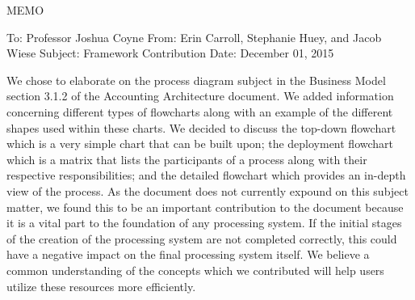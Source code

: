 MEMO

To:		Professor Joshua Coyne
From:		Erin Carroll, Stephanie Huey, and Jacob Wiese
Subject:	Framework Contribution
Date:		December 01, 2015

	We chose to elaborate on the process diagram subject in the Business Model section 3.1.2 of the Accounting Architecture document. We added information concerning different types of flowcharts along with an example of the different shapes used within these charts. We decided to discuss the top-down flowchart which is a very simple chart that can be built upon; the deployment flowchart which is a matrix that lists the participants of a process along with their respective responsibilities; and the detailed flowchart which provides an in-depth view of the process.
	As the document does not currently expound on this subject matter, we found this to be an important contribution to the document because it is a vital part to the foundation of any processing system. If the initial stages of the creation of the processing system are not completed correctly, this could have a negative impact on the final processing system itself. We believe a common understanding of the concepts which we contributed will help users utilize these resources more efficiently.  
